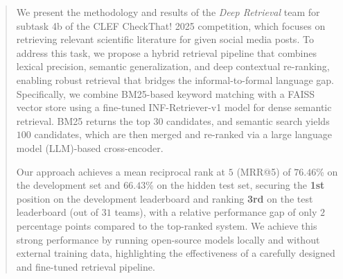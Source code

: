 \begin{abstract}
We present the methodology and results of the \emph{Deep Retrieval} team for subtask 4b of the CLEF CheckThat! 2025 competition, which focuses on retrieving relevant scientific literature for given social media posts. To address this task, we propose a hybrid retrieval pipeline that combines lexical precision, semantic generalization, and deep contextual re-ranking, enabling robust retrieval that bridges the informal-to-formal language gap.
%
Specifically, we combine BM25-based keyword matching with a FAISS vector store using a fine-tuned INF-Retriever-v1 model for dense semantic retrieval. BM25 returns the top $30$ candidates, and semantic search yields $100$ candidates, which are then merged and re-ranked via a large language model (LLM)-based cross-encoder.

Our approach achieves a mean reciprocal rank at $5$ (MRR@5) of $76.46$\% on the development set and $66.43$\% on the hidden test set, securing the \textbf{1st} position on the development leaderboard and ranking \textbf{3rd} on the test leaderboard (out of $31$ teams), with a relative performance gap of only $2$ percentage points compared to the top-ranked system.
We achieve this strong performance by running open-source models locally and without external training data, highlighting the effectiveness of a carefully designed and fine-tuned retrieval pipeline.
\end{abstract}